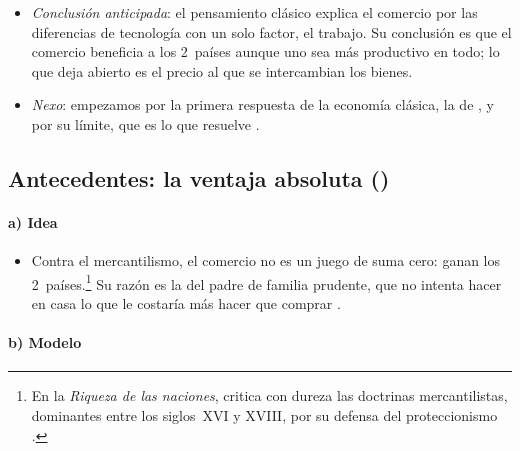\documentclass[11pt]{article}
\begin{document}
\begin{itemize}
\item \emph{Conclusión anticipada}: el pensamiento clásico explica el comercio por las diferencias de tecnología con un solo factor, el trabajo. Su conclusión es que el comercio beneficia a los 2~países aunque uno sea más productivo en todo; lo que deja abierto es el precio al que se intercambian los bienes.
\item \emph{Nexo}: empezamos por la primera respuesta de la economía clásica, la de , y por su límite, que es lo que resuelve .
\end{itemize}

\subsection{Antecedentes: la ventaja absoluta ()}\label{sec:smith}

\paragraph{a) Idea}

\begin{itemize}
\item Contra el mercantilismo, el comercio no es un juego de suma cero: ganan los 2~países.\footnote{En la \emph{Riqueza de las naciones},  critica con dureza las doctrinas mercantilistas, dominantes entre los siglos~XVI y XVIII, por su defensa del proteccionismo .} Su razón es la del padre de familia prudente, que no intenta hacer en casa lo que le costaría más hacer que comprar\nocite{Smith1776Wealth} .
\end{itemize}

\paragraph{b) Modelo}
\end{document}
